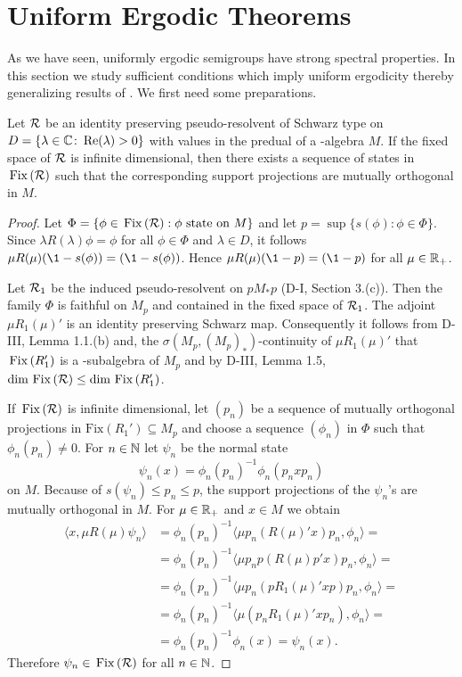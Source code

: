 \section{Uniform Ergodic Theorems}
As we have seen, uniformly ergodic semigroups have strong spectral properties.
In this section we study sufficient conditions which imply uniform ergodicity thereby generalizing results of 
\citet{groh:1984b}.
We first need some preparations.
\begin{lemma}\label{lem:d4-4.1}
Let $ \mathcal{R} $  be an identity preserving pseudo-resolvent of Schwarz type on $ D = \{\lambda \in \mathbb{C} \colon  \mathop{}\!\mathrm{Re}(\lambda) > 0\} $  with values in the predual of a \WA-algebra $ M $.
If the fixed space of $ \mathcal{R} $  is infinite dimensional, then there exists a sequence of states in $ \mathop{}\mathrm{Fix}\left(\mathcal{R}\right) $  such that the corresponding support projections are mutually orthogonal in $ M $.
\end{lemma}
\begin{proof}
Let $ \Phi = \{\phi \in \mathop{}\mathrm{Fix}\left(\mathcal{R}\right): \phi \text{ state on $ M $}\} $  and let $ p = \sup\{s(\phi): \phi \in \Phi\} $.
Since $ \lambda R(\lambda)\phi = \phi $  for all $ \phi \in \Phi $  and $ \lambda \in D $,  it follows $ \mu R(\mu)(\1 - s(\phi)) = (\1 - s(\phi)) $.
Hence $ \mu R(\mu)(\1 - p) = (\1 -p ) $  for all $ \mu \in \mathbb{R}_{+} $.

Let $ \mathcal{R}_{1} $  be the induced pseudo-resolvent on $ pM_{*}p $  (D-I, Section 3.(c)).
Then the family $ \Phi $  is faithful on $ M_{p} $  and contained in the fixed space of $ \mathcal{R}_{1} $.
The adjoint $ \mu R_{1}(\mu)' $  is an identity preserving Schwarz map.
Consequently it follows from D-III, Lemma 1.1.(b) and, the $ \sigma(M_{p},(M_{p})_{*}) $-continuity of $ \mu R_{1}(\mu)' $  that $ \mathop{}\mathrm{Fix}\left(R_{1}'\right) $  is a \WA-subalgebra of $ M_{p} $  and by D-III, Lemma 1.5, $ \dim \mathop{}\mathrm{Fix}\left(\mathcal{R}\right) \leq \dim \mathop{}\mathrm{Fix}\left(R_{1}'\right) $.

If $ \mathop{}\mathrm{Fix}\left(\mathcal{R}\right) $  is infinite dimensional, let $ (p_{n}) $  be a sequence of mutually orthogonal projections in $ \text{Fix}(R_{1}') \subseteq M_{p} $  and choose a sequence $ (\phi_{n}) $  in $ \Phi $  such that $ \phi_{n}(p_{n}) \neq 0 $.
For $ n \in \mathbb{N} $  let $ \psi_{n} $  be the normal state
\[
\psi_{n}(x) = \phi_{n}(p_{n})^{-1}\phi_{n}(p_{n}xp_{n})
\]
on $ M $.
Because of $ s(\psi_{n}) \leq p_{n} \leq p $, the support projections of the $ \psi_{n} $'s are mutually orthogonal in $ M $.
For $ \mu \in \mathbb{R}_{+} $  and $ x \in M $  we obtain
\[
\begin{aligned}
\langle x,\mu R(\mu)\psi_{n}\rangle &= \phi_{n}(p_{n})^{-1}\langle\mu p_{n}(R(\mu)'x)p_{n},\phi_{n}\rangle = \\
&= \phi_{n}(p_{n})^{-1}\langle\mu p_{n}p(R(\mu)p'x)p_{n},\phi_{n}\rangle = \\
&= \phi_{n}(p_{n})^{-1}\langle\mu p_{n}(pR_{1}(\mu)'xp)p_{n},\phi_{n}\rangle = \\
&= \phi_{n}(p_{n})^{-1}\langle\mu(p_{n}R_{1}(\mu)'xp_{n}),\phi_{n}\rangle = \\
&= \phi_{n}(p_{n})^{-1}\phi_{n}(x) = \psi_{n}(x).
\end{aligned}
\]
Therefore $ \psi_{n} \in \mathop{}\mathrm{Fix}\left(\mathcal{R}\right) $  for all $ n \in \mathbb{N} $.
\end{proof}
